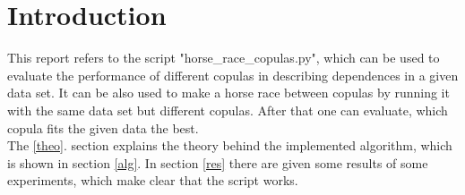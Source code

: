 \section{Introduction}\label{intro}

This report refers to the script "horse\_race\_copulas.py", which can be used to evaluate the performance of different copulas in describing dependences in a given data set. It can be also used to make a horse race between copulas by running it with the same data set but different copulas. After that one can evaluate, which copula fits the given data the best.\\

The \ref{theo}. section explains the theory behind the implemented algorithm, which is shown in section \ref{alg}. In section \ref{res} there are given some results of some experiments, which make clear that the script works.
